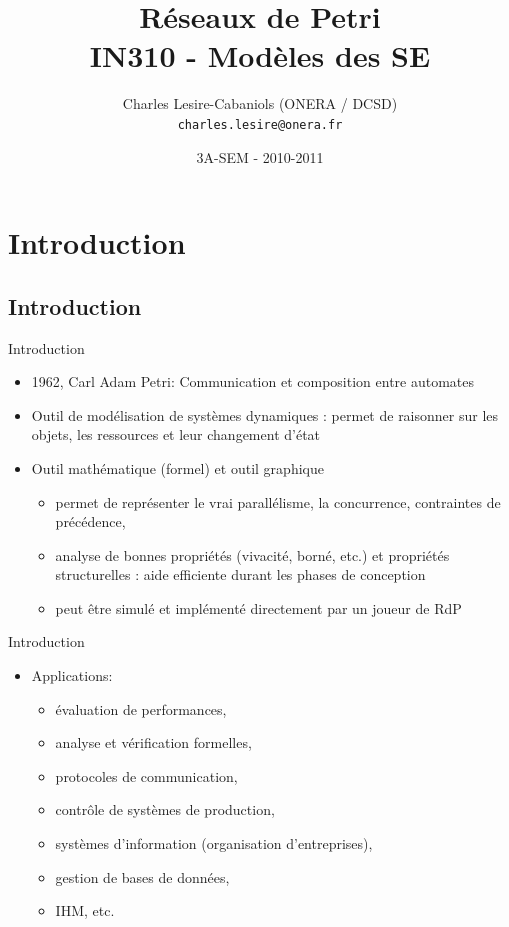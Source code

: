 \documentclass[compress]{beamer}
\title[SEM IN310 - Réseaux de Petri]{Réseaux de Petri\\IN310 - Modèles des SE}
\author[Charles Lesire]{Charles Lesire-Cabaniols (ONERA / DCSD)\\{\tt charles.lesire@onera.fr}}
\date[2010-2011]{3A-SEM - 2010-2011}
\begin{document}
\begin{frame}
\titlepage
\end{frame}

\begin{frame}
\tableofcontents[hidesubsections]
\end{frame}

\section{Introduction}
\subsection{Introduction}
\begin{frame}{Introduction}
\begin{itemize}
\item 1962, Carl Adam Petri: Communication et composition entre automates
\item Outil de modélisation de systèmes dynamiques : permet de raisonner sur les objets, les ressources et leur changement d'état
\item Outil mathématique (formel) et outil graphique
	\begin{itemize}
	\item permet de représenter le vrai parallélisme, la concurrence, contraintes de précédence,
	\item analyse de bonnes propriétés (vivacité, borné, etc.) et propriétés structurelles : aide efficiente durant les phases de conception
	\item peut être simulé et implémenté directement par un joueur de RdP
	\end{itemize} 
\end{itemize} 
\end{frame}

\begin{frame}{Introduction}
\begin{itemize}
\item Applications:
	\begin{itemize}
	\item évaluation de performances, 
	\item analyse et vérification formelles, 
	\item protocoles de communication, 
	\item contrôle de systèmes de production, 
	\item systèmes d'information (organisation d'entreprises), 
	\item gestion de bases de données, 
	\item IHM, etc.
	\end{itemize} 
\end{itemize} 
\end{frame}
\end{document}
